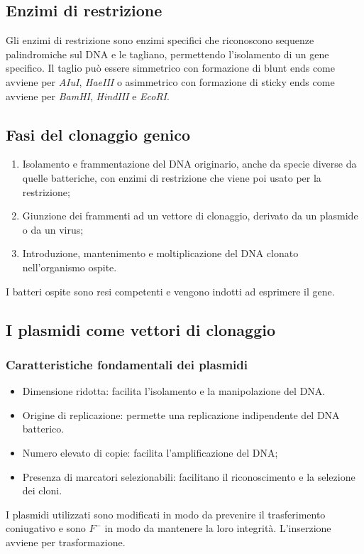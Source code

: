 	\subsection{Enzimi di restrizione}
	Gli enzimi di restrizione sono enzimi specifici che riconoscono sequenze palindromiche sul DNA e le tagliano, permettendo l'isolamento di un gene specifico.
	Il taglio pu\`o essere simmetrico con formazione di blunt ends come avviene per \emph{AIuI}, \emph{HaeIII} o asimmetrico con formazione di sticky ends come avviene per \emph{BamHI}, \emph{HindIII} e \emph{EcoRI}.

	\subsection{Fasi del clonaggio genico}
	\begin{multicols}{2}
		\begin{enumerate}
    			\item Isolamento e frammentazione del DNA originario, anche da specie diverse da quelle batteriche, con enzimi di restrizione che viene poi usato per la restrizione; 
    			\item Giunzione dei frammenti ad un vettore di clonaggio, derivato da un plasmide o da un virus; 
    			\item Introduzione, mantenimento e moltiplicazione del DNA clonato nell'organismo ospite. 
		\end{enumerate}
	\end{multicols}
	I batteri ospite sono resi competenti e vengono indotti ad esprimere il gene.

	\subsection{I plasmidi come vettori di clonaggio}

		\subsubsection{Caratteristiche fondamentali dei plasmidi}
		\begin{multicols}{2}
			\begin{itemize}
    				\item Dimensione ridotta: facilita l'isolamento e la manipolazione del DNA.
    				\item Origine di replicazione: permette una replicazione indipendente del DNA batterico.
    				\item Numero elevato di copie: facilita l'amplificazione del DNA;
    				\item Presenza di marcatori selezionabili: facilitano il riconoscimento e la selezione dei cloni. 
			\end{itemize}
		\end{multicols}
		I plasmidi utilizzati sono modificati in modo da prevenire il trasferimento coniugativo e sono \emph{$F^-$} in modo da mantenere la loro integrit\`a.
		L'inserzione avviene per trasformazione.
		
